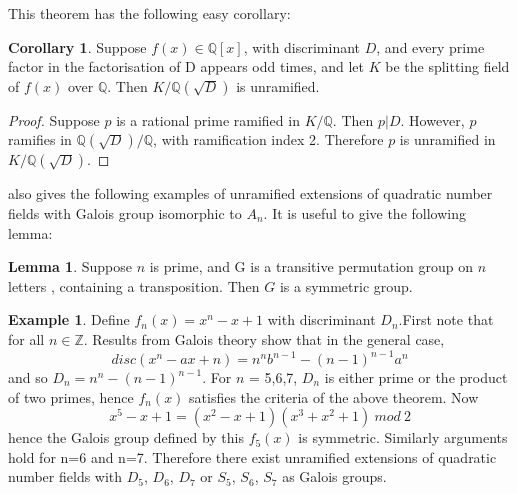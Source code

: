 \documentclass[12pt]{extarticle}
\newcommand{\Q}{\mathbb{Q}}
\newcommand{\<}{\langle}
\renewcommand{\>}{\rangle}
\theoremstyle{definition}
\newtheorem{corollary}{Corollary}
\newtheorem*{example}{Example}
\newtheorem{lemma}{Lemma}
\begin{document}
This theorem has the following easy corollary:
\begin{corollary}
Suppose $f(x) \in \Q[x]$, with discriminant $D$, and every prime factor in the factorisation of D appears odd times, and let $K$ be the splitting field of $f(x)$ over $\Q$. Then $K/\Q\left(\sqrt{D}\right)$ is unramified.
\end{corollary}
\begin{proof}
Suppose $p$ is a rational prime ramified in $K/\Q$. Then $p|D$. However, $p$ ramifies in $\Q(\sqrt{D})/\Q$, with ramification index 2. Therefore $p$ is unramified in $K/\Q(\sqrt{D})$. 
\end{proof}
\cite{uchida1970} also gives the following examples of unramified extensions of quadratic number fields with Galois group isomorphic to $A_n$.
It is useful to give the following lemma:
\begin{lemma}
Suppose $n$ is prime, and G is a transitive permutation group on $n$ letters , containing a transposition. Then $G$ is a symmetric group.
\end{lemma}

\begin{example}
Define $f_n(x) = x^n-x+1$ with discriminant $D_n$.First note that for all $n \in \mathbb{Z}$. Results from Galois theory show that in the general case, 
\begin{equation}
disc(x^n-ax+n) = n^nb^{n-1}-(n-1)^{n-1}a^n
\end{equation} and so $D_n = n^n-(n-1)^{n-1}$. For $n$ = 5,6,7, $D_n$ is either prime or the product of two primes, hence $f_n(x)$ satisfies the criteria of the above theorem.  Now 
\begin{equation}
x^5 - x+1 = (x^2 - x +1)(x^3 +x^2 +1)\:mod\:2
\end{equation}
hence the Galois group defined by this $f_5(x)$ is symmetric. Similarly arguments hold for n=6 and n=7. Therefore there exist unramified extensions of quadratic number fields with $D_5$, $D_6$, $D_7$ or $S_5$, $S_6$, $S_7$ as Galois groups. 
\end{example}
\end{document}
